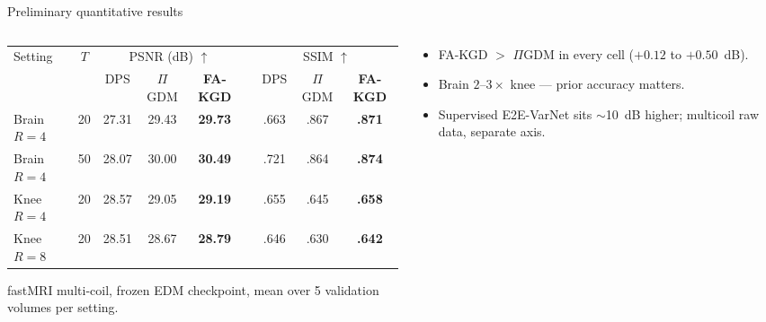 \documentclass[aspectratio=169]{beamer}
\newcommand{\PIGDM}{$\Pi$GDM}
\newcommand{\FAKGD}{FA-KGD}
\begin{document}
\begin{frame}{Preliminary quantitative results}
  \footnotesize
  \begin{columns}[T]
    \begin{column}{0.66\textwidth}
      \centering
      \setlength{\tabcolsep}{3pt}
      \scriptsize
      \begin{tabular}{@{}l c ccc c ccc@{}}
        \toprule
        \multirow{2}{*}{Setting} & \multirow{2}{*}{$T$}
          & \multicolumn{3}{c}{PSNR (dB) $\uparrow$} & \phantom{x}
          & \multicolumn{3}{c}{SSIM $\uparrow$} \\
        \cmidrule{3-5} \cmidrule{7-9}
         & & DPS & \PIGDM{} & \textbf{\FAKGD{}} &
         & DPS & \PIGDM{} & \textbf{\FAKGD{}} \\
        \midrule
        Brain $R{=}4$ & 20 & 27.31 & 29.43 & \textbf{29.73} & & .663 & .867 & \textbf{.871} \\
        Brain $R{=}4$ & 50 & 28.07 & 30.00 & \textbf{30.49} & & .721 & .864 & \textbf{.874} \\
        Knee $R{=}4$  & 20 & 28.57 & 29.05 & \textbf{29.19} & & .655 & .645 & \textbf{.658} \\
        Knee $R{=}8$  & 20 & 28.51 & 28.67 & \textbf{28.79} & & .646 & .630 & \textbf{.642} \\
        \bottomrule
      \end{tabular}

      \vspace{0.3em}
      {\scriptsize fastMRI multi-coil, frozen EDM checkpoint, mean over 5 validation volumes per setting.}
    \end{column}
    \begin{column}{0.33\textwidth}
      \begin{itemize}
        \item \FAKGD{} $>$ \PIGDM{} in every cell ($+0.12$ to $+0.50$~dB).
        \item Brain $2$--$3\times$ knee --- prior accuracy matters.
        \item Supervised E2E-VarNet sits $\sim$10~dB higher; multicoil raw data, separate axis.
      \end{itemize}
    \end{column}
  \end{columns}
\end{frame}
\end{document}

